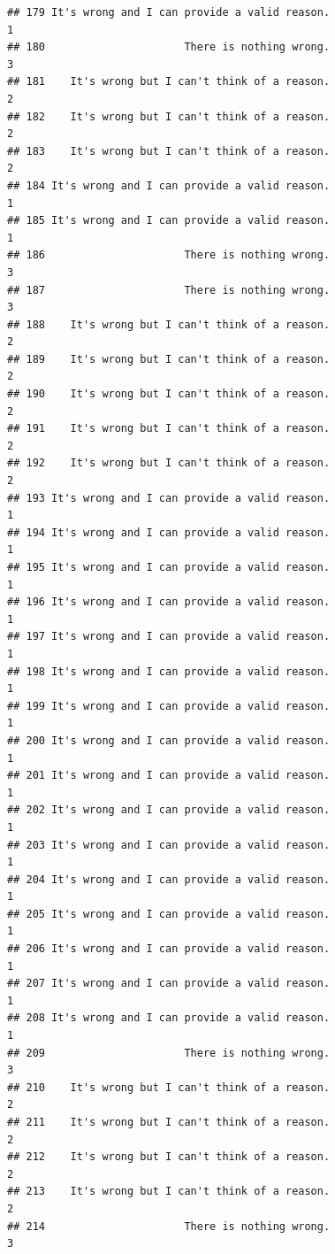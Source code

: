 \documentclass[
  american,
  man,floatsintext]{apa7}
\begin{document}
\begin{verbatim}
## 179 It's wrong and I can provide a valid reason.                    1
## 180                      There is nothing wrong.                    3
## 181    It's wrong but I can't think of a reason.                    2
## 182    It's wrong but I can't think of a reason.                    2
## 183    It's wrong but I can't think of a reason.                    2
## 184 It's wrong and I can provide a valid reason.                    1
## 185 It's wrong and I can provide a valid reason.                    1
## 186                      There is nothing wrong.                    3
## 187                      There is nothing wrong.                    3
## 188    It's wrong but I can't think of a reason.                    2
## 189    It's wrong but I can't think of a reason.                    2
## 190    It's wrong but I can't think of a reason.                    2
## 191    It's wrong but I can't think of a reason.                    2
## 192    It's wrong but I can't think of a reason.                    2
## 193 It's wrong and I can provide a valid reason.                    1
## 194 It's wrong and I can provide a valid reason.                    1
## 195 It's wrong and I can provide a valid reason.                    1
## 196 It's wrong and I can provide a valid reason.                    1
## 197 It's wrong and I can provide a valid reason.                    1
## 198 It's wrong and I can provide a valid reason.                    1
## 199 It's wrong and I can provide a valid reason.                    1
## 200 It's wrong and I can provide a valid reason.                    1
## 201 It's wrong and I can provide a valid reason.                    1
## 202 It's wrong and I can provide a valid reason.                    1
## 203 It's wrong and I can provide a valid reason.                    1
## 204 It's wrong and I can provide a valid reason.                    1
## 205 It's wrong and I can provide a valid reason.                    1
## 206 It's wrong and I can provide a valid reason.                    1
## 207 It's wrong and I can provide a valid reason.                    1
## 208 It's wrong and I can provide a valid reason.                    1
## 209                      There is nothing wrong.                    3
## 210    It's wrong but I can't think of a reason.                    2
## 211    It's wrong but I can't think of a reason.                    2
## 212    It's wrong but I can't think of a reason.                    2
## 213    It's wrong but I can't think of a reason.                    2
## 214                      There is nothing wrong.                    3

\end{verbatim}
\end{document}
